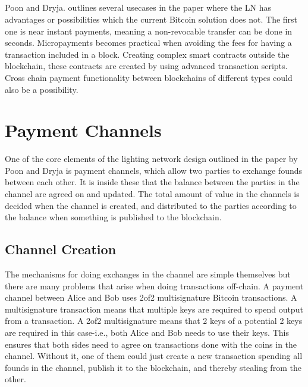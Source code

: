 \documentclass[informationsecurity]{gucmasterproject}
\begin{document}
\paragraph{}
Poon and Dryja. outlines several usecases in the paper \cite{poon2015bitcoin} where the LN has advantages or possibilities which the current Bitcoin solution does not. The first one is near instant payments, meaning a non-revocable transfer can be done in seconds. Micropayments becomes practical when avoiding the fees for having a transaction included in a block. Creating complex smart contracts outside the blockchain, these contracts are created by using advanced transaction scripts. Cross chain payment functionality between blockchains of different types could also be a possibility.



\chapter{Payment Channels}

\cite{decker2015fast}

One of the core elements of the lighting network design outlined in the paper by Poon and Dryja \cite{poon2015bitcoin} is payment channels, which allow two parties to exchange founds between each other.
It is inside these that the balance between the parties in the channel are agreed on and updated.
The total amount of value in the channels is decided when the channel is created, and distributed to the parties according to the balance when something is published to the blockchain.


\section{Channel Creation}

The mechanisms for doing exchanges in the channel are simple themselves but there are many problems that arise when doing transactions off-chain.
A payment channel between Alice and Bob uses 2of2 multisignature Bitcoin transactions. A multisignature transaction means that multiple keys are required to spend output from a transaction. A 2of2 multisignature means that 2 keys of a potential 2 keys are required in this case-i.e., both Alice and Bob needs to use their keys. This ensures that both sides need to agree on transactions done with the coins in the channel. Without it, one of them could just create a new transaction spending all founds in the channel, publish it to the blockchain, and thereby stealing from the other.
\end{document}

